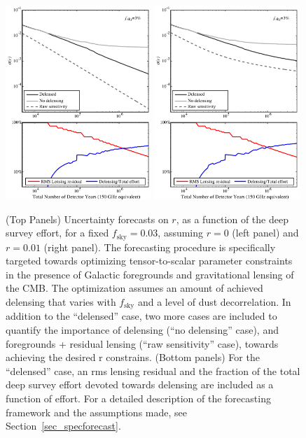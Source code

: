 \begin{figure}[!ht]
\begin{center}
\includegraphics[width=0.49\textwidth]{Inflation/sigr_effort_r0_v3.pdf}
\includegraphics[width=0.49\textwidth]{Inflation/sigr_effort_r01_v3.pdf}
\end{center}
\caption{(Top Panels)
Uncertainty forecasts on $r$, as a function of the deep survey effort, for a fixed
$f_\mathrm{sky}=0.03$, assuming $r=0$ (left panel) and $r=0.01$ (right panel).
The forecasting procedure is specifically targeted
towards optimizing tensor-to-scalar parameter constraints in the presence of 
Galactic foregrounds and gravitational lensing of the CMB. The optimization 
assumes an amount of achieved delensing that varies with $f_\mathrm{sky}$ and a
level of dust decorrelation. In addition to the ``delensed'' case, two more cases are
 included to quantify the importance of delensing (``no delensing'' case), and
foregrounds + residual lensing (``raw sensitivity'' case), towards achieving the
desired r constrains.
(Bottom panels)
For the ``delensed'' case, an rms lensing residual and the fraction of the total
deep survey effort devoted towards delensing are included as a function of
effort. For a detailed description of the forecasting framework and the
assumptions made, see Section~\ref{sec_specforecast}.}  
\label{fig_rforecast2}
\end{figure}

